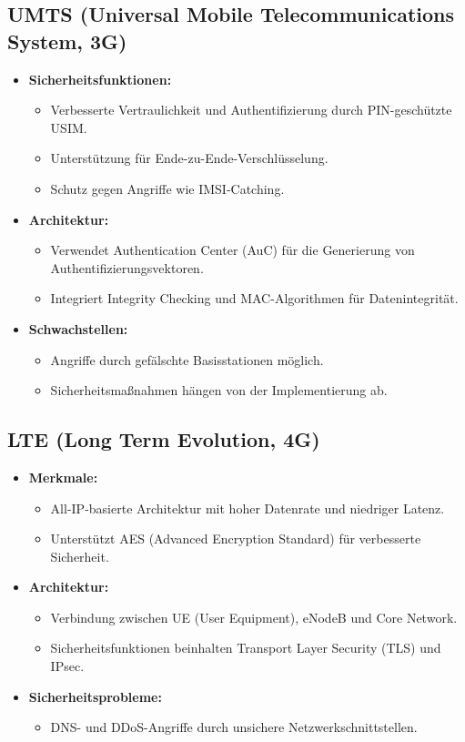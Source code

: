 \documentclass{article}
\begin{document}
\subsection{UMTS (Universal Mobile Telecommunications System, 3G)}
\begin{itemize}
    \item \textbf{Sicherheitsfunktionen:}
    \begin{itemize}
        \item Verbesserte Vertraulichkeit und Authentifizierung durch PIN-geschützte USIM.
        \item Unterstützung für Ende-zu-Ende-Verschlüsselung.
        \item Schutz gegen Angriffe wie IMSI-Catching.
    \end{itemize}
    \item \textbf{Architektur:}
    \begin{itemize}
        \item Verwendet Authentication Center (AuC) für die Generierung von Authentifizierungsvektoren.
        \item Integriert Integrity Checking und MAC-Algorithmen für Datenintegrität.
    \end{itemize}
    \item \textbf{Schwachstellen:}
    \begin{itemize}
        \item Angriffe durch gefälschte Basisstationen möglich.
        \item Sicherheitsmaßnahmen hängen von der Implementierung ab.
    \end{itemize}
\end{itemize}

\subsection{LTE (Long Term Evolution, 4G)}
\begin{itemize}
    \item \textbf{Merkmale:}
    \begin{itemize}
        \item All-IP-basierte Architektur mit hoher Datenrate und niedriger Latenz.
        \item Unterstützt AES (Advanced Encryption Standard) für verbesserte Sicherheit.
    \end{itemize}
    \item \textbf{Architektur:}
    \begin{itemize}
        \item Verbindung zwischen UE (User Equipment), eNodeB und Core Network.
        \item Sicherheitsfunktionen beinhalten Transport Layer Security (TLS) und IPsec.
    \end{itemize}
    \item \textbf{Sicherheitsprobleme:}
    \begin{itemize}
        \item DNS- und DDoS-Angriffe durch unsichere Netzwerkschnittstellen.
    \end{itemize}
\end{itemize}
\end{document}
